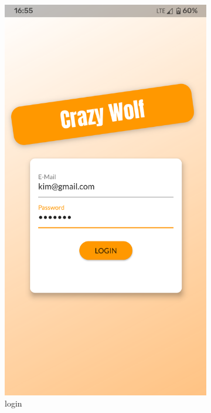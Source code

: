 \begin{figure}[!h]
    \centering
    \begin{subfigure}{.3\textwidth}
        \centering
        \includegraphics[width=0.9\linewidth]{screenshots/scenario_01/login.png}
        \caption{login}
        \label{fig:login}
    \end{subfigure}
    \begin{subfigure}{.3\textwidth}
        \centering

\end{subfigure}
\end{figure}
